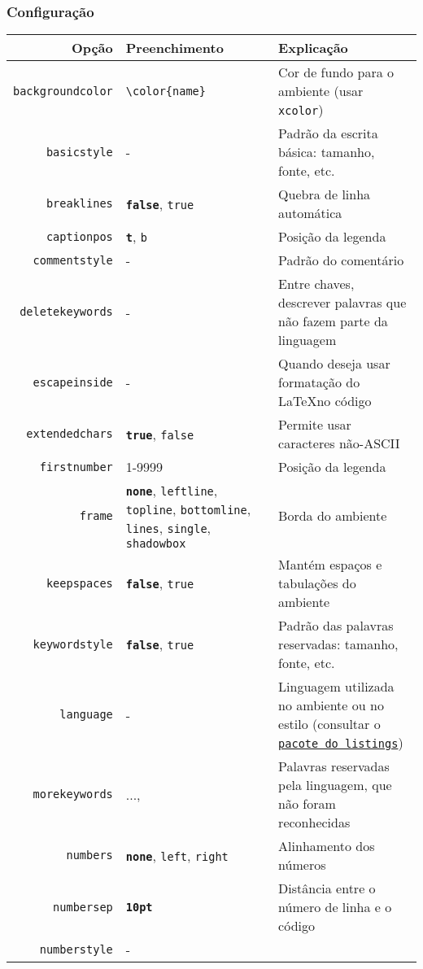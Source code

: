 \documentclass[brazilian]{beamer}
\begin{document}
\begin{frame}[fragile]
    \frametitle{Configuração}
\tiny
    \begin{table}
        \begin{tabular}{rC{2cm}O{6cm}}
            Opção & Preenchimento & Explicação \\ \hline
            \texttt{backgroundcolor} & \lstinline[style=myStyleLatex]!\color{name}! & Cor de fundo para o ambiente (usar \texttt{xcolor}) \\ \hline
            \texttt{basicstyle} & - & Padrão da escrita básica: tamanho, fonte, etc.  \\ \hline
            \texttt{breaklines} & \texttt{\bfseries false}, \texttt{true} & Quebra de linha automática \\ \hline
            \texttt{captionpos} & \texttt{\bfseries t}, \texttt{b} & Posição da legenda \\ \hline
            \texttt{commentstyle} & - & Padrão do comentário \\ \hline 
            \texttt{deletekeywords} & - & Entre chaves, descrever palavras que não fazem parte da linguagem \\ \hline
            \texttt{escapeinside} & - & Quando deseja usar formatação do \LaTeX no código  \\ \hline
            \texttt{extendedchars} & \texttt{\bfseries true}, \texttt{false} & Permite usar caracteres não-ASCII  \\ \hline
            \texttt{firstnumber} & 1-9999 & Posição da legenda \\ \hline
            \texttt{frame} & \texttt{\bfseries none}, \texttt{leftline}, \texttt{topline}, \texttt{bottomline}, \texttt{lines}, \texttt{single}, \texttt{shadowbox}  & Borda do ambiente \\ \hline
            \texttt{keepspaces} & \texttt{\bfseries false}, \texttt{true} & Mantém espaços e tabulações do ambiente \\ \hline
            \texttt{keywordstyle} & \texttt{\bfseries false}, \texttt{true} & Padrão das palavras reservadas: tamanho, fonte, etc.  \\ \hline
            \texttt{language} & - & Linguagem utilizada no ambiente ou no estilo (consultar o \href{https://ctan.dcc.uchile.cl/macros/latex/contrib/listings/listings.pdf}{\texttt{pacote do listings}}) \\ \hline
            \texttt{morekeywords} & {..., } & Palavras reservadas pela linguagem, que não foram reconhecidas \\ \hline
            \texttt{numbers} & \texttt{\bfseries none}, \texttt{left}, \texttt{right} & Alinhamento dos números \\ \hline
            \texttt{numbersep} & \texttt{\bfseries 10pt} & Distância entre o número de linha e o código \\ \hline
            \texttt{numberstyle} & -
        \end{tabular}
    \end{table}

\end{frame}
\end{document}

